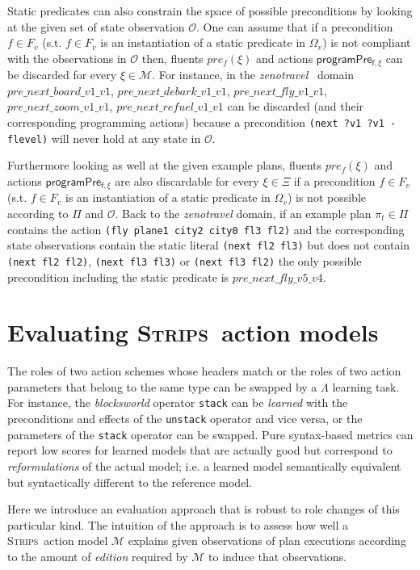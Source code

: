 \documentclass[3p,times]{elsarticle}
\newcommand{\strips}{\textsc{Strips}}     %
\begin{document}
Static predicates can also constrain the space of possible preconditions by looking at the given set of state observation $\mathcal{O}$. One can assume that if a precondition $f\in F_v$ (s.t. $f\in F_v$ is an instantiation of a static predicate in $\Omega_v$) is not compliant with the observations in $\mathcal{O}$ then, fluents $pre_f(\xi)$ and actions $\mathsf{programPre_{f,\xi}}$ can be discarded for every $\xi\in\mathcal{M}$. For instance, in the {\em zenotravel}~\cite{long20033rd} domain $pre\_next\_board\_v1\_v1$, $pre\_next\_debark\_v1\_v1$, $pre\_next\_fly\_v1\_v1$, $pre\_next\_zoom\_v1\_v1$, $pre\_next\_refuel\_v1\_v1$ can be discarded (and their corresponding programming actions) because a precondition {\tt\small(next ?v1 ?v1 - flevel)} will never hold at any state in $\mathcal{O}$.

Furthermore looking as well at the given example plans, fluents $pre_f(\xi)$ and actions $\mathsf{programPre_{f,\xi}}$ are also discardable for every $\xi\in\Xi$ if a precondition $f\in F_v$ (s.t. $f\in F_v$ is an instantiation of a static predicate in $\Omega_v$) is not possible according to $\Pi$ and $\mathcal{O}$. Back to the {\em zenotravel} domain, if an example plan $\pi_t\in \Pi$ contains the action {\tt\small (fly plane1 city2 city0 fl3 fl2)} and the corresponding state observations contain the static literal {\tt\small (next fl2 fl3)} but does not contain {\tt\small (next fl2 fl2)}, {\tt\small (next fl3 fl3)} or {\tt\small (next fl3 fl2)} the only possible precondition including the static predicate is $pre\_next\_fly\_v5\_v4$.



\section{Evaluating \strips\ action models}
\label{sec:Section6}
The roles of two action schemes whose headers match or the roles of two action parameters that belong to the same type can be swapped by a $\Lambda$ learning task. For instance, the {\em blocksworld} operator {\small\tt stack} can be {\em learned} with the preconditions and effects of the {\small\tt unstack} operator and vice versa, or the parameters of the {\small\tt stack} operator can be swapped. Pure syntax-based metrics can report low scores for learned models that are actually good but correspond to {\em reformulations} of the actual model; i.e. a learned model semantically equivalent but syntactically different to the reference model.

Here we introduce an evaluation approach that is robust to role changes of this particular kind. The intuition of the approach is to assess how well a \strips\ action model $\mathcal{M}$ explains given observations of plan executions according to the amount of {\em edition} required by $\mathcal{M}$ to induce that observations. %
\end{document}
